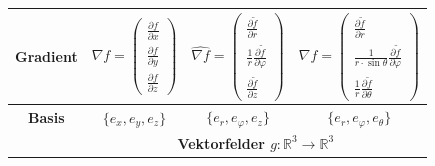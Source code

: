\documentclass[6pt,a4paper]{scrartcl}
\begin{document}
\begin{center}
\begin{tabular}{|c|c|c|c|}
        \hline
        \textbf{Gradient}         & $\nabla f=\begin{pmatrix} \frac{\partial f}{\partial x} \\ \frac{\partial f}{\partial y} \\ \frac{\partial f}{\partial z} \end{pmatrix}$                                                                         & $\widehat{\nabla f}=\begin{pmatrix} \frac{\partial\tilde{f}}{\partial r} \\ \frac{1}{r}\frac{\partial\tilde{f}}{\partial\varphi} \\ \frac{\partial\tilde{f}}{\partial z} \end{pmatrix}$                                                                                                                                                                     & $\widehat{\nabla f}=\begin{pmatrix} \frac{\partial\tilde{f}}{\partial r} \\ \frac{1}{r\cdot\sin\theta}\frac{\partial\tilde{f}}{\partial\varphi} \\ \frac{1}{r}\frac{\partial\tilde{f}}{\partial\theta} \end{pmatrix}$                                                                                                                                                                                                                                                                        \\
        \hline
        \textbf{Basis}            & $\{e_x,e_y,e_z\}$                                                                                             & $\{e_r,e_\varphi,e_z\}$                                                                                                                                                                                             & $\{e_r,e_\varphi,e_\theta\}$                                                                                                                                                                                                                                                                                           \\
        \hline
                                  & \multicolumn{3}{c|}{\textbf{Vektorfelder $g:\mathbb{R}^3\rightarrow\mathbb{R}^3$}}                                                                                                                                                                                                                                                                                                                                                                                                                                                                                                                                                                           \\

\end{tabular}
\end{center}
\end{document}
